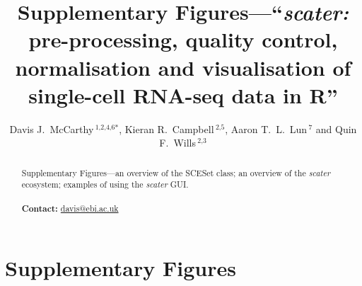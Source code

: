 \documentclass{revtex4}
\begin{document}
\title[scater supplementary figures]{Supplementary Figures---``\emph{scater:} pre-processing, quality control, normalisation and visualisation of single-cell RNA-seq data in R''}
\author{Davis J.~McCarthy\,$^{\text{1,2,4,6}*}$, Kieran R.~Campbell\,$^{\text{2,5}}$, Aaron T.~L.~Lun\,$^{\text{7}}$ and Quin F.~Wills\,$^{\text{2,3}}$}
\address{$^{\text{1}}$European Molecular Biology Laboratory - European Bioinformatics Institute (EMBL-EBI), Hinxton CB10 1SD, Cambridgeshire, UK;\\
$^{\text{2}}$Wellcome Trust Centre for Human Genetics, University of Oxford,
Oxford, Oxfordshire, UK;\\
$^{\text{3}}$ Weatherall Institute for Molecular Medicine, University of Oxford, Oxford, Oxfordshire, UK;\\
$^{\text{4}}$Department of Statistics, University of Oxford, Oxford, Oxfordshire, UK;\\
$^{\text{5}}$Department of Anatomy, Physiology and Genetics, University of Oxford, Oxford, Oxfordshire, UK;\\
$^{\text{6}}$St Vincent's Institute of Medical Research, 41 Victoria Parade Fitzroy Victoria 3065, Australia; and \\
$^{\text{7}}$CRUK Cambridge Institute, Robinson Way, Cambridge CB2 0RE,
Cambridgeshire, UK.}

\begin{abstract}
Supplementary Figures---an overview of the SCESet class; an overview of the \emph{scater} ecosystem; examples of using the \emph{scater} GUI.\\ \\
\textbf{Contact:} \href{davis@ebi.ac.uk}{davis@ebi.ac.uk}
\end{abstract}


\maketitle


\section*{Supplementary Figures}
\end{document}
